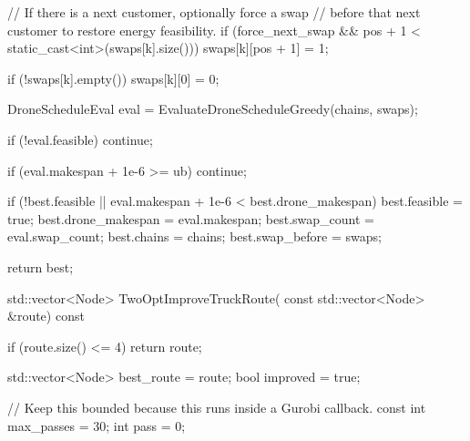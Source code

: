 {{{{{{{{                                // If there is a next customer, optionally force a swap
                                // before that next customer to restore energy feasibility.
                                if (force_next_swap && pos + 1 < static_cast<int>(swaps[k].size()))
                                {
                                    swaps[k][pos + 1] = 1;
                                }

                                if (!swaps[k].empty())
                                {
                                    swaps[k][0] = 0;
                                }

                                DroneScheduleEval eval =
                                    EvaluateDroneScheduleGreedy(chains, swaps);

                                if (!eval.feasible)
                                {
                                    continue;
                                }

                                if (eval.makespan + 1e-6 >= ub)
                                {
                                    continue;
                                }

                                if (!best.feasible ||
                                    eval.makespan + 1e-6 < best.drone_makespan)
                                {
                                    best.feasible = true;
                                    best.drone_makespan = eval.makespan;
                                    best.swap_count = eval.swap_count;
                                    best.chains = chains;
                                    best.swap_before = swaps;
                                }
                            }
                        }
                    }
                }

                return best;
            }

            std::vector<Node> TwoOptImproveTruckRoute(
                const std::vector<Node> &route) const
            {
                if (route.size() <= 4)
                {
                    return route;
                }

                std::vector<Node> best_route = route;
                bool improved = true;

                // Keep this bounded because this runs inside a Gurobi callback.
                const int max_passes = 30;
                int pass = 0;

}}}}
